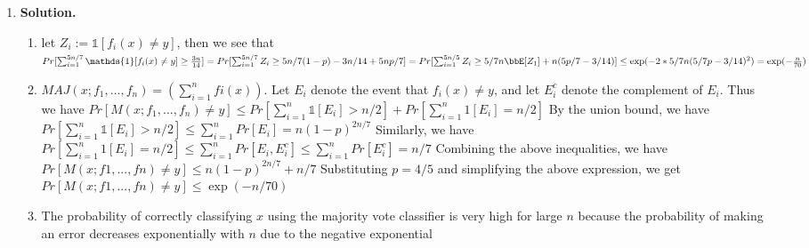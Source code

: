 \documentclass{article}
\def\1{\mathds{1}}
\theoremstyle{definition}
\theoremstyle{remark}
\newenvironment{Q}
{%
\clearpage
\item
}
{%
\phantom{s}%
\bigskip%
\noindent\textbf{Solution.}
}
\begin{document}
\begin{enumerate}[font={\Large\bfseries},left=0pt]
\begin{Q}
\end{Q}
\begin{enumerate}
  \item let $Z_i:=\1 [f_i(x) \neq y]$, then we see that 
  $Pr[\sum_{i=1}^{5n/7} \1[f_i(x)\neq y] \geq \frac{3n}{14}] \\
  = Pr[\sum_{i=1}^{5n/7} Z_i \geq 5n/7(1-p) - 3n/14 + 5np/7]
  = Pr[\sum_{i=1}^{5n/5} Z_i \geq 5/7n \bbE[Z_1]+n(5p/7-3/14)]\\
  \leq \exp(-2*5/7n(5/7p-3/14)^2) = \exp(-\frac{n}{70})$

  \item $MAJ(x; f_1, . . . , f_n) = (\sum_{i=1}^{n} fi(x))$.
  Let $E_i$ denote the event that $f_i(x) \neq y$, and let $E_i^c$ denote the complement of $E_i$. Thus we have
  $Pr[M(x; f_1, . . . , f_n) \neq y] \leq Pr[\sum_{i=1}^{n} \1[E_i] > n/2] + Pr[\sum_{i=1}^{n} 1[E_i] = n/2]$
  By the union bound, we have
  $Pr[\sum_{i=1}^{n} \1[E_i] > n/2] \leq \sum_{i=1}^{n} Pr[E_i] = n(1-p)^{2n/7}$
  Similarly, we have
  $Pr[\sum_{i=1}^{n} 1[E_i] = n/2] \leq \sum_{i=1}^{n} Pr[E_i,E_i^c] \leq \sum_{i=1}^{n} Pr[E_i^c] = n/7$
  Combining the above inequalities, we have
  $Pr[M(x; f1, . . . , fn) \neq y] \leq n(1-p)^{2n/7} + n/7$
  Substituting $p = 4/5$ and simplifying the above expression, we get
  $Pr[M(x; f1, . . . , fn) \neq y] \leq \exp(-n/70)$
  
  \item The probability of correctly classifying $x$ using the majority vote classifier is very high for large 
  $n$ because the probability of making an error decreases exponentially with $n$ due to the negative exponential
\end{enumerate}
\end{enumerate}
\end{document}
